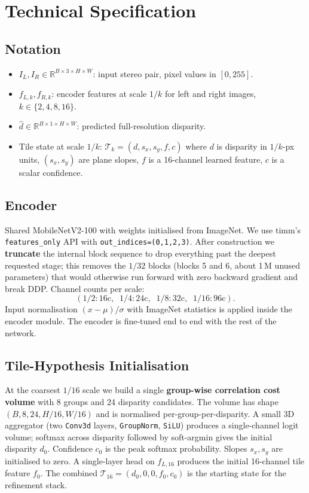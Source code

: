 \documentclass[11pt,a4paper]{article}
\begin{document}
\section{Technical Specification}

\subsection{Notation}
\begin{itemize}[leftmargin=*, topsep=0pt, itemsep=1pt]
  \item $I_L, I_R \in \mathbb{R}^{B\times 3\times H\times W}$: input stereo
    pair, pixel values in $[0, 255]$.
  \item $f_{L,k}, f_{R,k}$: encoder features at scale $1/k$ for left and
    right images, $k \in \{2, 4, 8, 16\}$.
  \item $\hat{d} \in \mathbb{R}^{B\times 1\times H\times W}$: predicted
    full-resolution disparity.
  \item Tile state at scale $1/k$: $\mathcal{T}_k = (d, s_x, s_y, f, c)$
    where $d$ is disparity in $1/k$-px units, $(s_x, s_y)$ are plane
    slopes, $f$ is a 16-channel learned feature, $c$ is a scalar
    confidence.
\end{itemize}

\subsection{Encoder}
Shared MobileNetV2-100 with weights initialised from ImageNet. We use
timm's \texttt{features\_only} API with \texttt{out\_indices=(0,1,2,3)}.
After construction we \textbf{truncate} the internal block sequence to
drop everything past the deepest requested stage; this removes the
$1/32$ blocks (blocks 5 and 6, about 1\,M unused parameters) that would
otherwise run forward with zero backward gradient and break DDP. Channel
counts per scale:
\[
  (1/2: 16\text{c},\;\; 1/4: 24\text{c},\;\; 1/8: 32\text{c},\;\; 1/16: 96\text{c}).
\]
Input normalisation $(x - \mu) / \sigma$ with ImageNet statistics is
applied inside the encoder module. The encoder is fine-tuned end to end
with the rest of the network.

\subsection{Tile-Hypothesis Initialisation}
At the coarsest $1/16$ scale we build a single \textbf{group-wise
correlation cost volume} with 8 groups and 24 disparity candidates. The
volume has shape $(B, 8, 24, H/16, W/16)$ and is normalised
per-group-per-disparity. A small 3D aggregator (two \texttt{Conv3d}
layers, \texttt{GroupNorm}, \texttt{SiLU}) produces a single-channel
logit volume; softmax across disparity followed by soft-argmin gives the
initial disparity $d_0$. Confidence $c_0$ is the peak softmax
probability. Slopes $s_x, s_y$ are initialised to zero. A single-layer
head on $f_{L,16}$ produces the initial 16-channel tile feature $f_0$.
The combined $\mathcal{T}_{16} = (d_0, 0, 0, f_0, c_0)$ is the starting
state for the refinement stack.
\end{document}
